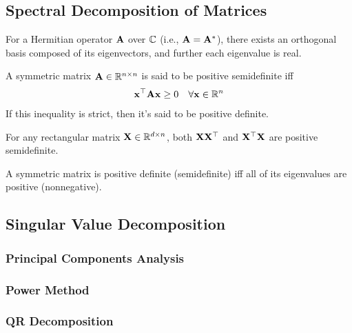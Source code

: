 \subsection{Spectral Decomposition of Matrices}
\begin{theorem}
    For a Hermitian operator $\mathbf{A}$ over $\mathbb{C}$ (i.e., $\mathbf{A} = \mathbf{A}^*$), there exists an orthogonal basis
    composed of its eigenvectors, and further each eigenvalue is real.
\end{theorem}
\begin{defn}
    A symmetric matrix $\mathbf{A} \in \mathbb{R}^{n \times n}$ is said to be positive semidefinite iff
    \begin{align*}
        \mathbf{x}^\top \mathbf{A} \mathbf{x} \geq 0 \quad \forall \mathbf{x} \in \mathbb{R}^n
    \end{align*}
    If this inequality is strict, then it's said to be positive definite.
\end{defn}
\begin{example}
    For any rectangular matrix ${\bf X} \in \mathbb{R}^{d \times n}$, both $\mathbf{X}\mathbf{X}^\top$ and $\mathbf{X}^\top \mathbf{X}$ are positive semidefinite.
\end{example}
\begin{theorem}
    A symmetric matrix is positive definite (semidefinite) iff all of its eigenvalues are positive (nonnegative).
\end{theorem}
\subsection{Singular Value Decomposition}
\subsubsection{Principal Components Analysis}
\subsubsection{Power Method}
\subsubsection{QR Decomposition}
